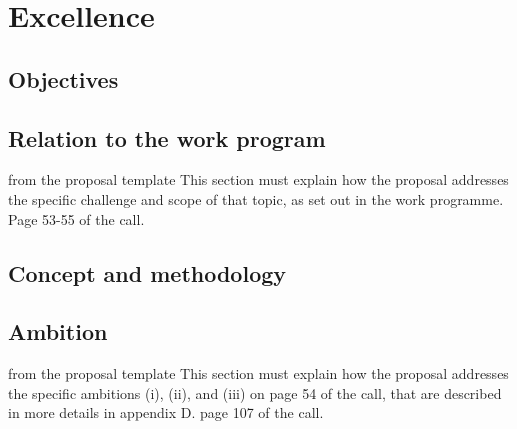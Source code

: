 \chapter{Excellence}


\section{Objectives}


\section{Relation to the work program}
\begin{todo}{from the proposal template}\color{red}
  This section must explain how the proposal addresses the specific challenge and scope of
  that topic, as set out in the work programme. Page 53-55 of the call.
\end{todo}


\section{Concept and methodology}


\section{Ambition}
\begin{todo}{from the proposal template}\color{red}
  This section must explain how the proposal addresses the specific ambitions (i), (ii),
  and (iii) on page 54 of the call, that are described in more details in appendix D. page
  107 of the call.
\end{todo}
\newpage 

